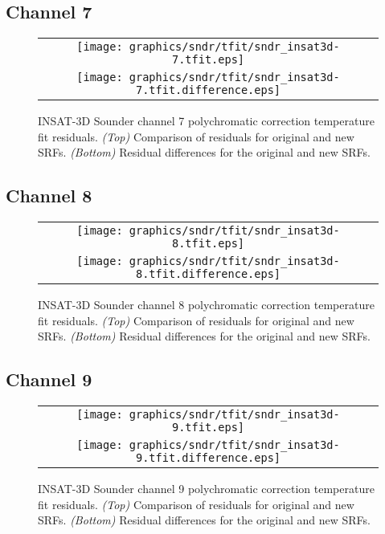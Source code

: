 \subsection{Channel 7}
\begin{figure}[H]
  \label{fig:sndr_ch7_tfit}
  \centering
  \begin{tabular}{c}
    \texttt{[image: graphics/sndr/tfit/sndr\_insat3d-7.tfit.eps]} \\
    \texttt{[image: graphics/sndr/tfit/sndr\_insat3d-7.tfit.difference.eps]}
  \end{tabular}
  \caption{INSAT-3D Sounder channel 7 polychromatic correction temperature fit residuals. \emph{(Top)} Comparison of residuals for original and new SRFs. \emph{(Bottom)} Residual differences for the original and new SRFs.}
\end{figure}

\subsection{Channel 8}
\begin{figure}[H]
  \label{fig:sndr_ch8_tfit}
  \centering
  \begin{tabular}{c}
    \texttt{[image: graphics/sndr/tfit/sndr\_insat3d-8.tfit.eps]} \\
    \texttt{[image: graphics/sndr/tfit/sndr\_insat3d-8.tfit.difference.eps]}
  \end{tabular}
  \caption{INSAT-3D Sounder channel 8 polychromatic correction temperature fit residuals. \emph{(Top)} Comparison of residuals for original and new SRFs. \emph{(Bottom)} Residual differences for the original and new SRFs.}
\end{figure}

\subsection{Channel 9}
\begin{figure}[H]
  \label{fig:sndr_ch9_tfit}
  \centering
  \begin{tabular}{c}
    \texttt{[image: graphics/sndr/tfit/sndr\_insat3d-9.tfit.eps]} \\
    \texttt{[image: graphics/sndr/tfit/sndr\_insat3d-9.tfit.difference.eps]}
  \end{tabular}
  \caption{INSAT-3D Sounder channel 9 polychromatic correction temperature fit residuals. \emph{(Top)} Comparison of residuals for original and new SRFs. \emph{(Bottom)} Residual differences for the original and new SRFs.}
\end{figure}

